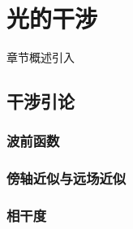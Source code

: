 \chapter{光的干涉}\label{25}

章节概述引入

\section{干涉引论}\label{25-1}

\subsection{波前函数}\label{25-1-1}

\subsection{傍轴近似与远场近似}\label{25-1-2}

\subsection{相干度}\label{25-1-3}
